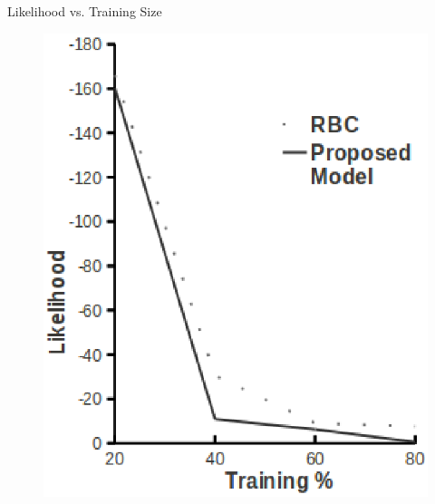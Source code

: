 \documentclass[10pt, blue,subsection=true, compress]{beamer}
\begin{document}
\begin{frame}
\begin{columns}[t]
\begin{block}{Likelihood vs. Training Size}
\begin{figure}[htbp]
\centering
\includegraphics[scale=0.25]{img/hep-lh.eps}
\end{figure}
\end{block}
\end{columns}

\end{frame}
\end{document}
